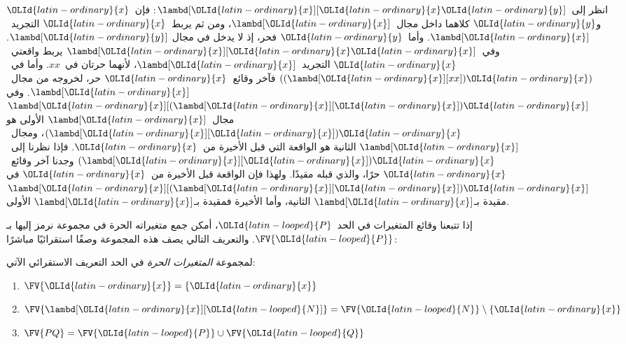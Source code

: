 \documentclass[../../../include/open-logic-section]{subfiles}
\begin{document}
\begin{ex}
  انظر إلى~$\lambd[{\OLId{latin-ordinary}{x}}][{\OLId{latin-ordinary}{x}} {\OLId{latin-ordinary}{y}}]$: فإن~${\OLId{latin-ordinary}{x}}$ و${\OLId{latin-ordinary}{y}}$ كلاهما داخل مجال~$\lambd[{\OLId{latin-ordinary}{x}}]$،
  ومن ثم يربط~${\OLId{latin-ordinary}{x}}$ التجريد~$\lambd[{\OLId{latin-ordinary}{x}}]$. وأما~${\OLId{latin-ordinary}{y}}$ فحر، إذ لا يدخل في مجال
  $\lambd[{\OLId{latin-ordinary}{y}}]$. وفي~$\lambd[{\OLId{latin-ordinary}{x}}][{\OLId{latin-ordinary}{x}} {\OLId{latin-ordinary}{x}}]$ يربط واقعتي~${\OLId{latin-ordinary}{x}}$ التجريد~$\lambd[{\OLId{latin-ordinary}{x}}]$،
  لأنهما حرتان في~$xx$. وأما في~$((\lambd[{\OLId{latin-ordinary}{x}}][xx]){\OLId{latin-ordinary}{x}})$ فآخر وقائع~${\OLId{latin-ordinary}{x}}$ حر،
  لخروجه من مجال~$\lambd[{\OLId{latin-ordinary}{x}}]$. وفي
  $\lambd[{\OLId{latin-ordinary}{x}}][(\lambd[{\OLId{latin-ordinary}{x}}][{\OLId{latin-ordinary}{x}}]){\OLId{latin-ordinary}{x}}]$ مجال~$\lambd[{\OLId{latin-ordinary}{x}}]$ الأولى هو
  $(\lambd[{\OLId{latin-ordinary}{x}}][{\OLId{latin-ordinary}{x}}]){\OLId{latin-ordinary}{x}}$، ومجال~$\lambd[{\OLId{latin-ordinary}{x}}]$ الثانية هو الواقعة التي قبل الأخيرة
  من~${\OLId{latin-ordinary}{x}}$. فإذا نظرنا إلى~$(\lambd[{\OLId{latin-ordinary}{x}}][{\OLId{latin-ordinary}{x}}]){\OLId{latin-ordinary}{x}}$ وجدنا آخر وقائع~${\OLId{latin-ordinary}{x}}$ حرًا،
  والذي قبله مقيدًا. ولهذا فإن الواقعة قبل الأخيرة من~${\OLId{latin-ordinary}{x}}$ في
  $\lambd[{\OLId{latin-ordinary}{x}}][(\lambd[{\OLId{latin-ordinary}{x}}][{\OLId{latin-ordinary}{x}}]){\OLId{latin-ordinary}{x}}]$ مقيدة بـ$\lambd[{\OLId{latin-ordinary}{x}}]$ الثانية، وأما الأخيرة فمقيدة بـ$\lambd[{\OLId{latin-ordinary}{x}}]$ الأولى.
\end{ex}

إذا تتبعنا وقائع المتغيرات في الحد~${\OLId{latin-looped}{P}}$، أمكن جمع متغيراته الحرة في مجموعة نرمز إليها بـ$\FV{{\OLId{latin-looped}{P}}}$.
والتعريف التالي يصف هذه المجموعة وصفًا استقرائيًا مباشرًا:

\begin{defn} 
  لمجموعة \emph{المتغيرات الحرة} في الحد التعريف الاستقرائي الآتي:
  \begin{enumerate}
    \item $\FV{{\OLId{latin-ordinary}{x}}} = \{{\OLId{latin-ordinary}{x}}\}$ 
    \item $\FV{\lambd[{\OLId{latin-ordinary}{x}}][{\OLId{latin-looped}{N}}]} = \FV{{\OLId{latin-looped}{N}}} \setminus \{{\OLId{latin-ordinary}{x}}\}$    
    \item $\FV{PQ} = \FV{{\OLId{latin-looped}{P}}} \cup \FV{{\OLId{latin-looped}{Q}}}$ 
  \end{enumerate}
\end{defn}
\end{document}
